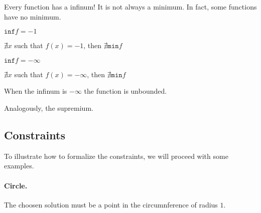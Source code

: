 Every function has a infinum! It is not always a minimum. In fact, some functions have no minimum.

\begin{minipage}{0.5\textwidth}
    \begin{center}
        \( \mathtt{inf} f = -1 \)

        \( \nexists x \) such that \( f(x) = -1 \), then \( \nexists \mathtt{min} f \)
    \end{center}
\end{minipage}
\begin{minipage}{0.5\textwidth}

    \begin{center}
        \( \mathtt{inf} f = -\infty \)

        \( \nexists x \) such that \( f(x) = -\infty \), then \( \nexists \mathtt{min} f \)
    \end{center}
\end{minipage}

When the infinum is \( -\infty \) the function is unbounded.

Analogously, the supremium.

\subsection{Constraints}

To illustrate how to formalize the constraints, we will proceed with some examples.

\paragraph{Circle.} The choosen solution must be a point in the circumnference of radius \( 1 \). 

